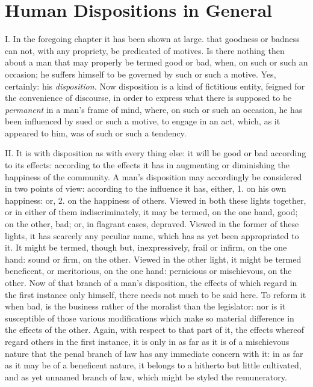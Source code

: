 \documentclass[12pt]{report}
\begin{document}
\chapter{Human Dispositions in General}

I. In the foregoing chapter it has been shown at large. that goodness or
badness can not, with any propriety, be predicated of motives. Is there
nothing then about a man that may properly be termed good or bad, when,
on such or such an occasion; he suffers himself to be governed by such
or such a motive. Yes, certainly: his \emph{disposition.} Now
disposition is a kind of fictitious entity, feigned for the convenience
of discourse, in order to express what there is supposed to be
\emph{permanent} in a man's frame of mind, where, on such or such an
occasion, he has been influenced by sued or such a motive, to engage in
an act, which, as it appeared to him, was of such or such a tendency.

II. It is with disposition as with every thing else: it will be good or
bad according to its effects: according to the effects it has in
augmenting or diminishing the happiness of the community. A man's
disposition may accordingly be considered in two points of view:
according to the influence it has, either, 1. on his own happiness: or,
2. on the happiness of others. Viewed in both these lights together, or
in either of them indiscriminately, it may be termed, on the one hand,
good; on the other, bad; or, in flagrant cases, depraved. Viewed in the
former of these lights, it has scarcely any peculiar name, which has as
yet been appropriated to it. It might be termed, though but,
inexpressively, frail or infirm, on the one hand: sound or firm, on the
other. Viewed in the other light, it might be termed beneficent, or
meritorious, on the one hand: pernicious or mischievous, on the other.
Now of that branch of a man's disposition, the effects of which regard
in the first instance only himself, there needs not much to be said
here. To reform it when bad, is the business rather of the moralist than
the legislator: nor is it susceptible of those various modifications
which make so material difference in the effects of the other. Again,
with respect to that part of it, the effects whereof regard others in
the first instance, it is only in as far as it is of a mischievous
nature that the penal branch of law has any immediate concern with it:
in as far as it may be of a beneficent nature, it belongs to a hitherto
but little cultivated, and as yet unnamed branch of law, which might be
styled the remuneratory.
\end{document}

